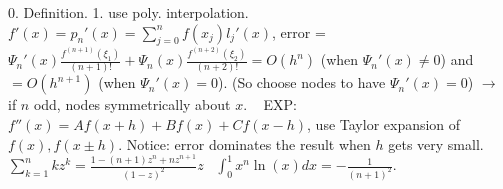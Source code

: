  0. Definition. 1. use poly. interpolation. $f'(x) = p_n'(x) = \sum_{j=0}^{n}f(x_j)l_j'(x) $, error = $\Psi_n'(x)\frac{f^{(n+1)}(\xi_1)}{(n+1)!}+\Psi_n(x)\frac{f^{(n+2)}(\xi_2)}{(n+2)!} = O(h^n)$ (when $\Psi_n'(x)\ne 0 $) and $= O(h^{n+1})$ (when $\Psi_n'(x) = 0 $). (So choose nodes to have $\Psi_n'(x) = 0 $) $\to$ if $n$ odd, nodes symmetrically about $x$. ~ EXP: $f''(x) = Af(x+h)+Bf(x)+Cf(x-h)$, use Taylor expansion of $f(x), f(x\pm h)$. Notice: error dominates the result when $h$ gets very small. \\[5pt]

 $\sum_{k=1}^{n}kz^k = \frac{1-(n+1)z^n+nz^{n+1}}{(1-z)^2}z $ ~$\int_{0}^1x^n\ln(x)dx = -\frac{1}{(n+1)^2} $.
